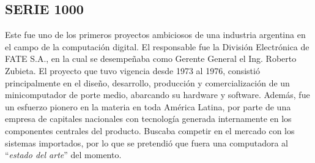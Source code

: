 \documentclass[%
 	final,
%
	notitlepage,
	narroweqnarray,
	inline,
 	twoside,
	]{ieee}
\begin{document}
\subsection*{SERIE 1000}
Este fue uno de los primeros proyectos ambiciosos de una industria argentina en el campo de la computaci\'on digital. El responsable fue la Divisi\'on Electr\'onica  de FATE S.A., en la cual se desempe\~naba como Gerente General el Ing. Roberto Zubieta.
El proyecto que tuvo vigencia desde 1973 al 1976, consisti\'o principalmente en el dise\~no, desarrollo, producci\'on y comercializaci\'on de un minicomputador de porte medio, abarcando su hardware y software. Adem\'as, fue un esfuerzo pionero en la materia en toda Am\'erica Latina, por parte de una empresa de capitales nacionales con tecnolog\'ia generada internamente en los componentes centrales del producto. Buscaba competir en el mercado con los sistemas importados, por lo que se pretendi\'o que fuera una computadora al ``\textit{estado del arte}'' del momento.
\end{document}
